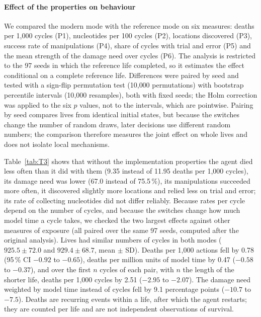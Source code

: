 \documentclass[preprint,12pt,authoryear]{elsarticle}
\begin{document}
\paragraph{Effect of the properties on behaviour} We compared the modern mode with the reference mode on six measures: deaths per 1{,}000 cycles (P1), nucleotides per 100 cycles (P2), locations discovered (P3), success rate of manipulations (P4), share of cycles with trial and error (P5) and the mean strength of the damage need over cycles (P6). The analysis is restricted to the 97 seeds in which the reference life completed, so it estimates the effect conditional on a complete reference life. Differences were paired by seed and tested with a sign-flip permutation test (10{,}000 permutations) with bootstrap percentile intervals (10{,}000 resamples), both with fixed seeds; the Holm correction was applied to the six $p$ values, not to the intervals, which are pointwise. Pairing by seed compares lives from identical initial states, but because the switches change the number of random draws, later decisions use different random numbers; the comparison therefore measures the joint effect on whole lives and does not isolate local mechanisms.

{\footnotesize\setlength{\tabcolsep}{1.8pt}}

Table~\ref{tab:T3} shows that without the implementation properties the agent died less often than it did with them (9.35 instead of 11.95 deaths per 1{,}000 cycles), its damage need was lower (67.0 instead of 75.5\,\%), its manipulations succeeded more often, it discovered slightly more locations and relied less on trial and error; its rate of collecting nucleotides did not differ reliably. Because rates per cycle depend on the number of cycles, and because the switches change how much model time a cycle takes, we checked the two largest effects against other measures of exposure (all paired over the same 97 seeds, computed after the original analysis). Lives had similar numbers of cycles in both modes ($925.5 \pm 72.0$ and $929.4 \pm 68.7$, mean $\pm$ SD). Deaths per 1{,}000 actions fell by 0.78 (95\,\% CI $-0.92$ to $-0.65$), deaths per million units of model time by 0.47 ($-0.58$ to $-0.37$), and over the first $n$ cycles of each pair, with $n$ the length of the shorter life, deaths per 1{,}000 cycles by 2.51 ($-2.95$ to $-2.07$). The damage need weighted by model time instead of cycles fell by 9.1 percentage points ($-10.7$ to $-7.5$). Deaths are recurring events within a life, after which the agent restarts; they are counted per life and are not independent observations of survival.
\end{document}
